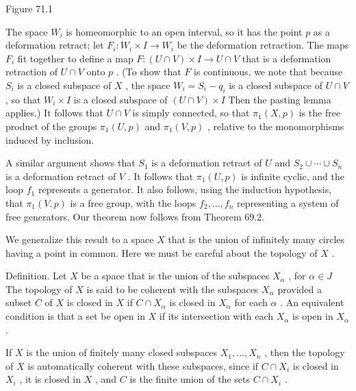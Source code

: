 Figure 71.1

The space \({W}_{i}\) is homeomorphic to an open interval, so it has the point \(p\) as a deformation retract; let \({F}_{i} : {W}_{i} \times  I \rightarrow  {W}_{i}\) be the deformation retraction. The maps \({F}_{i}\) fit together to define a map \(F : \left( {U \cap  V}\right)  \times  I \rightarrow  U \cap  V\) that is a deformation retraction of \(U \cap  V\) onto \(p\) . (To show that \(F\) is continuous, we note that because \({S}_{i}\) is a closed subspace of \(X\) , the space \({W}_{i} = {S}_{i} - {q}_{i}\) is a closed subspace of \(U \cap  V\) , so that \({W}_{i} \times  I\) is a closed subspace of \(\left( {U \cap  V}\right)  \times  I\) Then the pasting lemma applies.) It follows that \(U \cap  V\) is simply connected, so that \({\pi }_{1}\left( {X,p}\right)\) is the free product of the groups \({\pi }_{1}\left( {U,p}\right)\) and \({\pi }_{1}\left( {V,p}\right)\) , relative to the monomorphisms induced by inclusion.

A similar argument shows that \({S}_{1}\) is a deformation retract of \(U\) and \({S}_{2} \cup  \cdots  \cup  {S}_{n}\) is a deformation retract of \(V\) . It follows that \({\pi }_{1}\left( {U,p}\right)\) is infinite cyclic, and the loop \({f}_{1}\) represents a generator. It also follows, using the induction hypothesis, that \({\pi }_{1}\left( {V,p}\right)\) is a free group, with the loops \({f}_{2},\ldots ,{f}_{n}\) representing a system of free generators. Our theorem now follows from Theorem 69.2.

We generalize this result to a space \(X\) that is the union of infinitely many circles having a point in common. Here we must be careful about the topology of \(X\) .

Definition. Let \(X\) be a space that is the union of the subspaces \({X}_{\alpha }\) , for \(\alpha  \in  J\) The topology of \(X\) is said to be coherent with the subspaces \({X}_{\alpha }\) provided a subset \(C\) of \(X\) is closed in \(X\) if \(C \cap  {X}_{\alpha }\) is closed in \({X}_{\alpha }\) for each \(\alpha\) . An equivalent condition is that a set be open in \(X\) if its intersection with each \({X}_{\alpha }\) is open in \({X}_{\alpha }\) .

If \(X\) is the union of finitely many closed subspaces \({X}_{1},\ldots ,{X}_{n}\) , then the topology of \(X\) is automatically coherent with these subspaces, since if \(C \cap  {X}_{i}\) is closed in \({X}_{i}\) , it is closed in \(X\) , and \(C\) is the finite union of the sets \(C \cap  {X}_{i}\) .


